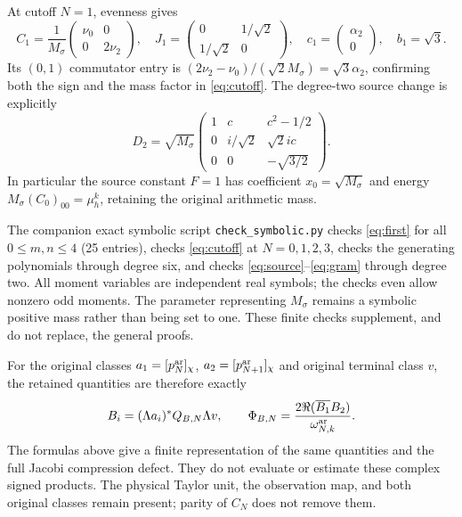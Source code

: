 \documentclass[11pt]{article}
\begin{document}
At cutoff $N=1$, evenness gives
\[
 C_1=\frac1{M_\sigma}\begin{pmatrix}\nu_0&0\\0&2\nu_2\end{pmatrix},
 \quad J_1=\begin{pmatrix}0&1/\sqrt2\\1/\sqrt2&0\end{pmatrix},
 \quad c_1=\begin{pmatrix}\alpha_2\\0\end{pmatrix},\quad b_1=\sqrt3.
\]
Its $(0,1)$ commutator entry is
$(2\nu_2-\nu_0)/(\sqrt2M_\sigma)=\sqrt3\alpha_2$,
confirming both the sign and the mass factor in \eqref{eq:cutoff}.
The degree-two source change is explicitly
\[
 D_2=\sqrt{M_\sigma}
 \begin{pmatrix}
 1&c&c^2-1/2\\
 0&i/\sqrt2&\sqrt2ic\\
 0&0&-\sqrt{3/2}
 \end{pmatrix}.
\]
In particular the source constant $F=1$ has coefficient
$x_0=\sqrt{M_\sigma}$ and energy
$M_\sigma(C_0)_{00}=\mu_h^k$, retaining the original arithmetic mass.

The companion exact symbolic script \texttt{check\_symbolic.py}
checks \eqref{eq:first} for all $0\leq m,n\leq4$ (25 entries),
checks \eqref{eq:cutoff} at $N=0,1,2,3$, checks the generating
polynomials through degree six, and checks
\eqref{eq:source}--\eqref{eq:gram} through degree two. All moment
variables are independent real symbols; the checks even allow
nonzero odd moments. The parameter representing $M_\sigma$ remains
a symbolic positive mass rather than being set to one. These
finite checks supplement, and do not replace, the general proofs.

For the original classes $a_1=[p_N^{\rm ar}]_\chi$,
$a_2=[p_{N+1}^{\rm ar}]_\chi$ and original terminal class $v$, the
retained quantities are therefore exactly
\[
 B_i=(\Lambda a_i)^*Q_{B,N}\Lambda v,\qquad
 \Phi_{B,N}=\frac{2\Re(\overline{B_1}B_2)}{\omega_{N,k}^{\rm ar}}.
\]
The formulas above give a finite representation of the same
quantities and the full Jacobi compression defect. They do not
evaluate or estimate these complex signed products. The physical
Taylor unit, the observation map, and both original classes remain
present; parity of $C_N$ does not remove them.
\end{document}
